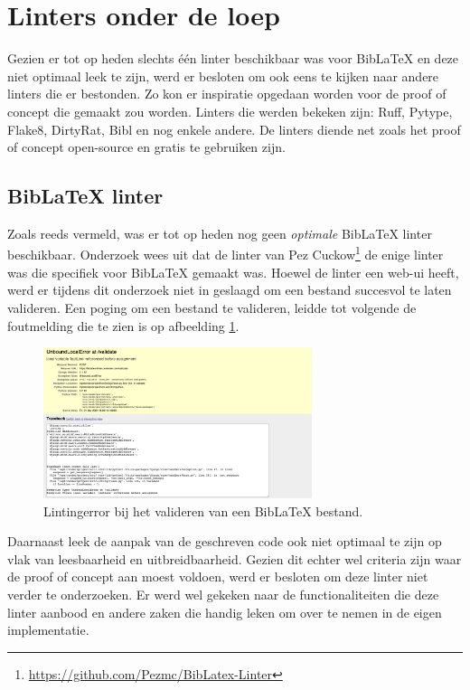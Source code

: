 \section{Linters onder de loep}
\label{sec:linters-onder-de-loep}

Gezien er tot op heden slechts één linter beschikbaar was voor BibLaTeX en deze niet optimaal leek te zijn, werd er besloten om ook eens te kijken naar andere linters die er bestonden. Zo kon er inspiratie opgedaan worden voor de proof of concept die gemaakt zou worden. Linters die werden bekeken zijn: Ruff, Pytype, Flake8, DirtyRat, Bibl en nog enkele andere. De linters diende net zoals het proof of concept open-source en gratis te gebruiken zijn.

\subsection{BibLaTeX linter}
\label{sec:biblatex-linter}
Zoals reeds vermeld, was er tot op heden nog geen \emph{optimale} BibLaTeX linter beschikbaar. Onderzoek wees uit dat de linter van Pez Cuckow\footnote{\url{https://github.com/Pezmc/BibLatex-Linter}} de enige linter was die specifiek voor BibLaTeX gemaakt was. Hoewel de linter een web-ui heeft, werd er tijdens dit onderzoek niet in geslaagd om een bestand succesvol te laten valideren. Een poging om een bestand te valideren, leidde tot volgende de foutmelding die te zien is op afbeelding \ref{fig:biblatex-linter-error}.

\begin{figure}[ht]
    \centering
    \includegraphics[width=0.7\textwidth]{./files/Pezmc-LinterError_cropped.png}
    \caption[Foutmelding BibLaTeX-linter]{Lintingerror bij het valideren van een BibLaTeX bestand.}
    \label{fig:biblatex-linter-error}
\end{figure}

Daarnaast leek de aanpak van de geschreven code ook niet optimaal te zijn op vlak van leesbaarheid en uitbreidbaarheid. Gezien dit echter wel criteria zijn waar de proof of concept aan moest voldoen, werd er besloten om deze linter niet verder te onderzoeken. Er werd wel gekeken naar de functionaliteiten die deze linter aanbood en andere zaken die handig leken om over te nemen in de eigen implementatie.


